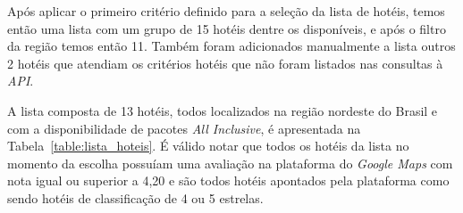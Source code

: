 Após aplicar o primeiro critério definido para a seleção da lista de hotéis, temos então uma lista com um grupo de 15 hotéis dentre os disponíveis, e após o filtro da região temos então 11. Também foram adicionados manualmente a lista outros 2 hotéis que atendiam os critérios hotéis que não foram listados nas consultas à \textit{API}.

A lista composta de 13 hotéis, todos localizados na região nordeste do Brasil e com a disponibilidade de pacotes \textit{All Inclusive}, é apresentada na Tabela~\ref{table:lista_hoteis}. É válido notar que todos os hotéis da lista no momento da escolha possuíam uma avaliação na plataforma do \textit{Google Maps} com nota igual ou superior a 4,20 e são todos hotéis apontados pela plataforma como sendo hotéis de classificação de 4 ou 5 estrelas.

